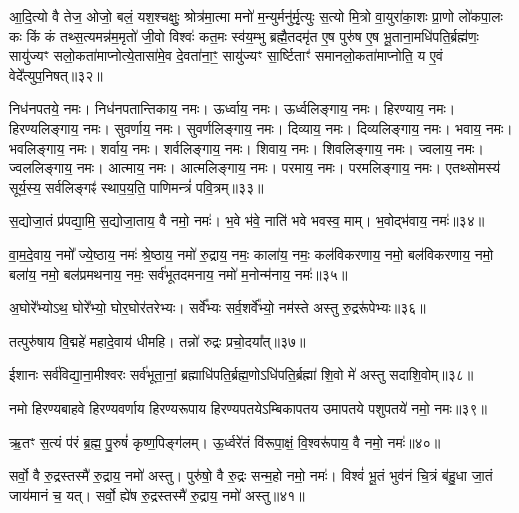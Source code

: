 आ॒दि॒त्यो वै तेज॒ ओजो॒ बलं॒ यश॒श्चक्षुः॒ श्रोत्र॑मा॒त्मा मनो॑ म॒न्युर्मनु॑र्मृ॒त्युः स॒त्यो मि॒त्रो वा॒युरा॑का॒शः प्रा॒णो लो॑कपा॒लः कः किं कं तथ्स॒त्यमन्न॑म॒मृतो॑ जी॒वो विश्वः॑ कत॒मः स्व॑य॒म्भु ब्रह्मै॒तदमृ॑त ए॒ष पुरु॑ष ए॒ष भू॒ताना॒मधि॑पति॒र्ब्रह्म॑णः॒ सायु॑ज्यꣳ सलो॒कता॑माप्नोत्ये॒तासा॑मे॒व दे॒वता॑ना॒ꣳ॒ सायु॑ज्यꣳ सा॒र्ष्टिताꣳ॑ समानलो॒कता॑माप्नोति॒ य ए॒वं वेदे᳚त्युप॒निषत्॥३२॥
\anuvakamend

निध॑नपतये॒ नमः। 
निध॑नपतान्तिकाय॒ नमः। 
ऊर्ध्वाय॒ नमः। 
ऊर्ध्वलिङ्गाय॒ नमः। 
हिरण्याय॒ नमः। 
हिरण्यलिङ्गाय॒ नमः। 
सुवर्णाय॒ नमः। 
सुवर्णलिङ्गाय॒ नमः। 
दिव्याय॒ नमः। 
दिव्यलिङ्गाय॒ नमः। 
भवाय॒ नमः। 
भवलिङ्गाय॒ नमः। 
शर्वाय॒ नमः। 
शर्वलिङ्गाय॒ नमः। 
शिवाय॒ नमः। 
शिवलिङ्गाय॒ नमः। 
ज्वलाय॒ नमः। 
ज्वललिङ्गाय॒ नमः। 
आत्माय॒ नमः। 
आत्मलिङ्गाय॒ नमः। 
परमाय॒ नमः। 
परमलिङ्गाय॒ नमः। 
एतथ्सोमस्य॑ सूर्य॒स्य॒ सर्वलिङ्गꣴ॑ स्थाप॒य॒ति॒ पाणिमन्त्रं॑ पवि॒त्रम्॥३३॥
\anuvakamend

स॒द्योजा॒तं प्र॑पद्या॒मि॒ स॒द्योजा॒ताय॒ वै नमो॒ नमः॑। 
भ॒वे भ॑वे॒ नाति॑ भवे भवस्व॒ माम्। 
भ॒वोद्भ॑वाय॒ नमः॑॥३४॥
\anuvakamend

वा॒म॒दे॒वाय॒ नमो᳚ ज्ये॒ष्ठाय॒ नमः॑ श्रे॒ष्ठाय॒ नमो॑ रु॒द्राय॒ नमः॒ काला॑य॒ नमः॒ कल॑विकरणाय॒ नमो॒ बल॑विकरणाय॒ नमो॒ बला॑य॒ नमो॒ बल॑प्रमथनाय॒ नमः॒ सर्व॑भूतदमनाय॒ नमो॑ म॒नोन्म॑नाय॒ नमः॑॥३५॥\anuvakamend

अ॒घोरे᳚भ्योऽथ॒ घोरे᳚भ्यो॒ घोर॒घोर॑तरेभ्यः। 
सर्वे᳚भ्यः सर्व॒शर्वे᳚भ्यो॒ नम॑स्ते अस्तु रु॒द्ररू॑पेभ्यः॥३६॥
\anuvakamend

तत्पुरु॑षाय वि॒द्महे॑ महादे॒वाय॑ धीमहि। 
तन्नो॑ रुद्रः प्रचो॒दया᳚त्॥३७॥
\anuvakamend

ईशानः सर्व॑विद्या॒ना॒मीश्वरः सर्व॑भूता॒नां॒ ब्रह्माधि॑पति॒र्ब्रह्म॒णो\-ऽधि॑पति॒र्ब्रह्मा॑ शि॒वो मे॑ अस्तु सदाशि॒वोम्॥३८॥
\anuvakamend

नमो हिरण्यबाहवे हिरण्यवर्णाय हिरण्यरूपाय हिरण्यपतये\-ऽम्बिकापतय उमापतये पशुपतये॑ नमो॒ नमः॥३९॥
\anuvakamend

ऋ॒तꣳ स॒त्यं प॑रं ब्र॒ह्म॒ पु॒रुषं॑ कृष्ण॒पिङ्ग॑लम्। 
ऊ॒र्ध्वरे॑तं वि॑रूपा॒क्षं॒ वि॒श्वरू॑पाय॒ वै नमो॒ नमः॑॥४०॥
\anuvakamend

सर्वो॒ वै रु॒द्रस्तस्मै॑ रु॒द्राय॒ नमो॑ अस्तु। 
पुरु॑षो॒ वै रु॒द्रः सन्म॒हो नमो॒ नमः॑। 
विश्वं॑ भू॒तं भुव॑नं चि॒त्रं ब॑हु॒धा जा॒तं जाय॑मानं च॒ यत्। 
सर्वो॒ ह्ये॑ष रु॒द्रस्तस्मै॑ रु॒द्राय॒ नमो॑ अस्तु॥४१॥
\anuvakamend


